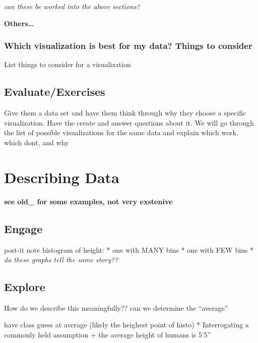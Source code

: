 \documentclass[
]{book}
\begin{document}
\emph{can these be worked into the above sections?}

\textbf{Others\ldots{}}

\hypertarget{which-visualization-is-best-for-my-data-things-to-consider}{%
\subsection{Which visualization is best for my data? Things to consider}\label{which-visualization-is-best-for-my-data-things-to-consider}}

List things to consider for a visualization

\hypertarget{evaluateexercises-1}{%
\section{Evaluate/Exercises}\label{evaluateexercises-1}}

Give them a data set and have them think through why they choose a specific visualization. Have the create and answer questions about it.
We will go through the list of possible visualizations for the same data and explain which work, which dont, and why

\hypertarget{describing-data}{%
\chapter{Describing Data}\label{describing-data}}

\textbf{see old\_ for some examples, not very exstenive}

\hypertarget{engage-2}{%
\section{Engage}\label{engage-2}}

post-it note histogram of height:
* one with MANY bins
* one with FEW bins
* \emph{do these graphs tell the same story??}

\hypertarget{explore-2}{%
\section{Explore}\label{explore-2}}

How do we describe this meaningfully??
can we determine the ``average''

have class guess at average (likely the heighest point of histo)
* Interrogating a commonly held assumption
+ the average height of humans is 5'5''
\end{document}
